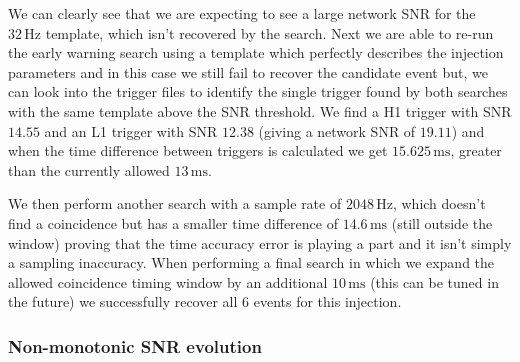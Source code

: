 %
We can clearly see that we are expecting to see a large network SNR for the $32 \, \text{Hz}$ template, which isn't recovered by the search. Next we are able to re-run the early warning search using a template which perfectly describes the injection parameters and in this case we still fail to recover the candidate event but, we can look into the trigger files to identify the single trigger found by both searches with the same template above the SNR threshold. We find a H1 trigger with SNR $14.55$ and an L1 trigger with SNR $12.38$ (giving a network SNR of $19.11$) and when the time difference between triggers is calculated we get $15.625 \, \text{ms}$, greater than the currently allowed $13 \, \text{ms}$. 

We then perform another search with a sample rate of $2048 \,\text{Hz}$, which doesn't find a coincidence but has a smaller time difference of $14.6 \, \text{ms}$ (still outside the window) proving that the time accuracy error is playing a part and it isn't simply a sampling inaccuracy. When performing a final search in which we expand the allowed coincidence timing window by an additional $10 \, \text{ms}$ (this can be tuned in the future) we successfully recover all $6$ events for this injection.


\subsubsection{\label{6:sec:non-mono-snr}Non-monotonic SNR evolution}

